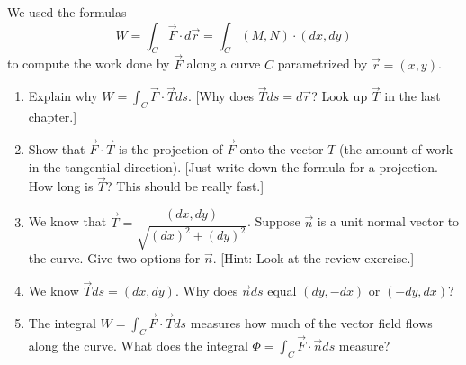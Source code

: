 \begin{problem}
We used the formulas $$W = \int_C \vec F\cdot d\vec r  = \int_C (M,N)\cdot(dx,dy)$$ to compute the work done by $\vec F$ along a curve $C$ parametrized by $\vec r = (x,y)$. 
\begin{enumerate}
 \item Explain why $W = \int_C \vec F\cdot \vec T ds$. [Why does $\vec T ds = d\vec r$?  Look up $\vec T$ in the last chapter.]
%
 \item Show that $\vec F\cdot \vec T$ is the projection of $\vec F$ onto the vector $T$ (the amount of work in the tangential direction). [Just write down the formula for a projection.  How long is $\vec T$?  This should be really fast.]
 \item 
{}%
We know that $\vec T = \dfrac{(dx, dy)}{\sqrt{(dx)^2+(dy)^2}}$.  Suppose $\vec n$ is a unit normal vector to the curve. Give two options for $\vec n$. [Hint: Look at the review exercise.]
 \item We know  $\vec T ds = (dx,dy)$. Why does $\vec n ds$ equal $(dy,-dx)$ or $(-dy,dx)$?
 \item The integral $W = \int_C \vec F\cdot \vec T ds$ measures how much of the vector field flows along the curve.  What does the integral $\Phi = \int_C \vec F\cdot \vec n ds$ measure?
\end{enumerate}

\end{problem}

